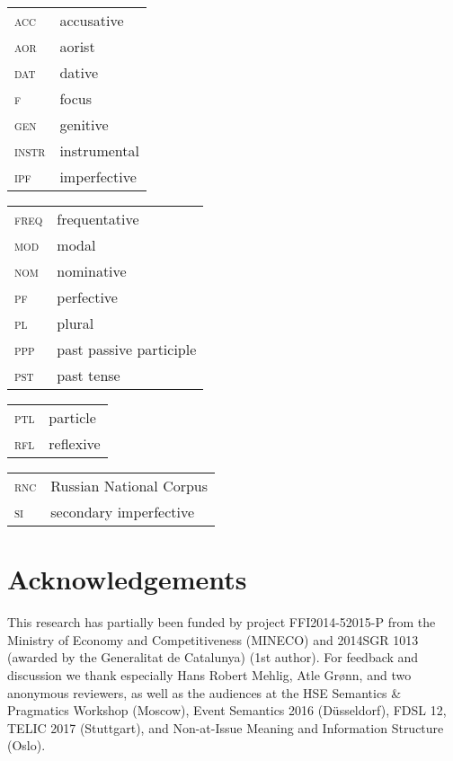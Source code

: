 \documentclass[output=paper,modfonts,newtxmath,hidelinks
]{langscibook}
\begin{document}
\begin{tabularx}{.5\textwidth}{@{}lQ@{}}
\textsc{acc}&accusative\\
\textsc{aor}&aorist\\
\textsc{dat}&dative\\
\textsc{f}&focus\\
\textsc{gen}&genitive\\
\textsc{instr}&instrumental\\
\textsc{ipf}&imperfective\\
\end{tabularx}%
\begin{tabularx}{.5\textwidth}{@{}lQ@{}}
\textsc{freq}&frequentative\\
\textsc{mod}&modal\\
\textsc{nom}&nominative\\
\textsc{pf}&perfective\\
\textsc{pl}&plural\\
\textsc{ppp}&past passive participle\\
\textsc{pst}&past tense\\
\end{tabularx}%

\begin{tabularx}{.5\textwidth}{@{}lQ@{}}
\textsc{ptl}&particle\\
\textsc{rfl}&reflexive\\
\end{tabularx}%
\begin{tabularx}{.5\textwidth}{@{}lQ@{}}
\textsc{rnc}&Russian National Corpus\\
\textsc{si}&secondary imperfective\\
\end{tabularx}


\section*{Acknowledgements}

This research has partially been funded by project FFI2014-52015-P from the Ministry of Economy and Competitiveness (MINECO) and 2014SGR 1013 (awarded by the Generalitat de Catalunya) (1st author). For feedback and discussion we thank especially Hans Robert Mehlig, Atle Grønn, and  two anonymous reviewers, as well as the audiences at the HSE Semantics \& Pragmatics Workshop (Moscow), Event Semantics 2016 (D\"{u}sseldorf), FDSL 12, TELIC 2017 (Stuttgart), and Non-at-Issue Meaning and Information Structure (Oslo).

\largerpage
\sloppy\printbibliography[heading=subbibliography,notkeyword=this]
\end{document}
